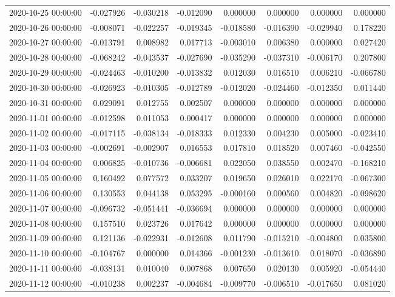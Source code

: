 \begin{tabular}{lrrrrrrr}
2020-10-25 00:00:00 & -0.027926 & -0.030218 & -0.012090 & 0.000000 & 0.000000 & 0.000000 & 0.000000 \\
2020-10-26 00:00:00 & -0.008071 & -0.022257 & -0.019345 & -0.018580 & -0.016390 & -0.029940 & 0.178220 \\
2020-10-27 00:00:00 & -0.013791 & 0.008982 & 0.017713 & -0.003010 & 0.006380 & 0.000000 & 0.027420 \\
2020-10-28 00:00:00 & -0.068242 & -0.043537 & -0.027690 & -0.035290 & -0.037310 & -0.006170 & 0.207800 \\
2020-10-29 00:00:00 & -0.024463 & -0.010200 & -0.013832 & 0.012030 & 0.016510 & 0.006210 & -0.066780 \\
2020-10-30 00:00:00 & -0.026923 & -0.010305 & -0.012789 & -0.012020 & -0.024460 & -0.012350 & 0.011440 \\
2020-10-31 00:00:00 & 0.029091 & 0.012755 & 0.002507 & 0.000000 & 0.000000 & 0.000000 & 0.000000 \\
2020-11-01 00:00:00 & -0.012598 & 0.011053 & 0.000417 & 0.000000 & 0.000000 & 0.000000 & 0.000000 \\
2020-11-02 00:00:00 & -0.017115 & -0.038134 & -0.018333 & 0.012330 & 0.004230 & 0.005000 & -0.023410 \\
2020-11-03 00:00:00 & -0.002691 & -0.002907 & 0.016553 & 0.017810 & 0.018520 & 0.007460 & -0.042550 \\
2020-11-04 00:00:00 & 0.006825 & -0.010736 & -0.006681 & 0.022050 & 0.038550 & 0.002470 & -0.168210 \\
2020-11-05 00:00:00 & 0.160492 & 0.077572 & 0.033207 & 0.019650 & 0.026010 & 0.022170 & -0.067300 \\
2020-11-06 00:00:00 & 0.130553 & 0.044138 & 0.053295 & -0.000160 & 0.000560 & 0.004820 & -0.098620 \\
2020-11-07 00:00:00 & -0.096732 & -0.051441 & -0.036694 & 0.000000 & 0.000000 & 0.000000 & 0.000000 \\
2020-11-08 00:00:00 & 0.157510 & 0.023726 & 0.017642 & 0.000000 & 0.000000 & 0.000000 & 0.000000 \\
2020-11-09 00:00:00 & 0.121136 & -0.022931 & -0.012608 & 0.011790 & -0.015210 & -0.004800 & 0.035800 \\
2020-11-10 00:00:00 & -0.104767 & 0.000000 & 0.014366 & -0.001230 & -0.013610 & 0.018070 & -0.036890 \\
2020-11-11 00:00:00 & -0.038131 & 0.010040 & 0.007868 & 0.007650 & 0.020130 & 0.005920 & -0.054440 \\
2020-11-12 00:00:00 & -0.010238 & 0.002237 & -0.004684 & -0.009770 & -0.006510 & -0.017650 & 0.081020 \\

\end{tabular}
